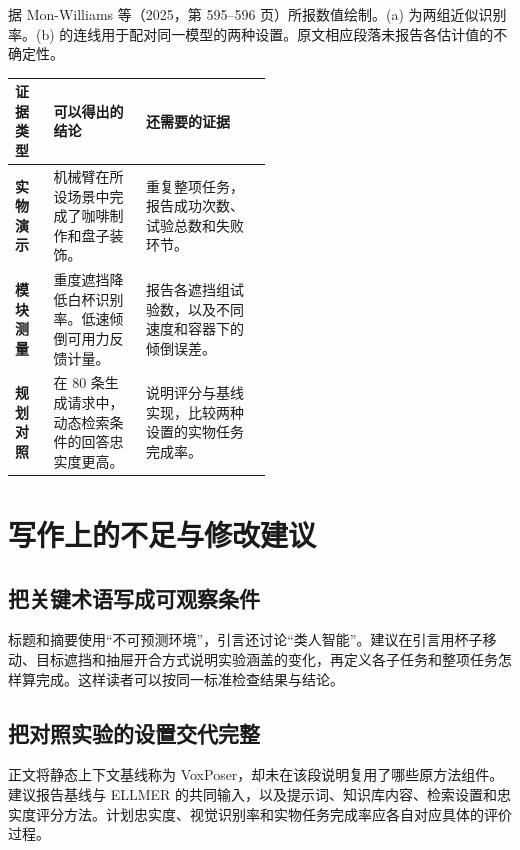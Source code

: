 \documentclass[UTF8,11pt,a4paper,twoside,fontset=none,heading=false]{ctexart}
\begin{document}
\begin{center}
\begin{minipage}{\linewidth}
\label{fig:results}
{\small\raggedright 据 Mon-Williams 等（2025，第 595--596 页）所报数值绘制。(a) 为两组近似识别率。(b) 的连线用于配对同一模型的两种设置。原文相应段落未报告各估计值的不确定性。\par}
\end{minipage}
\end{center}

\begin{center}
\begin{minipage}{\linewidth}
\centering
{}
\label{tab:evidence}
\small
\renewcommand{\arraystretch}{1.15}
\begin{tabularx}{\linewidth}{
  @{}>{\raggedright\arraybackslash\bfseries}p{0.15\linewidth}
  >{\raggedright\arraybackslash}p{0.36\linewidth}
  >{\raggedright\arraybackslash}X@{}}
\toprule
证据类型 & \textbf{可以得出的结论} & \textbf{还需要的证据} \\
\midrule
实物演示 & 机械臂在所设场景中完成了咖啡制作和盘子装饰。
  & 重复整项任务，报告成功次数、试验总数和失败环节。 \\
\addlinespace[3pt]
模块测量 & 重度遮挡降低白杯识别率。低速倾倒可用力反馈计量。
  & 报告各遮挡组试验数，以及不同速度和容器下的倾倒误差。 \\
\addlinespace[3pt]
规划对照 & 在 80 条生成请求中，动态检索条件的回答忠实度更高。
  & 说明评分与基线实现，比较两种设置的实物任务完成率。 \\
\bottomrule
\end{tabularx}
\end{minipage}
\end{center}

\clearpage
\section{写作上的不足与修改建议}

\subsection*{把关键术语写成可观察条件}
标题和摘要使用“不可预测环境”，引言还讨论“类人智能”。建议在引言用杯子移动、目标遮挡和抽屉开合方式说明实验涵盖的变化，再定义各子任务和整项任务怎样算完成。这样读者可以按同一标准检查结果与结论。

\subsection*{把对照实验的设置交代完整}
正文将静态上下文基线称为 VoxPoser，却未在该段说明复用了哪些原方法组件。建议报告基线与 ELLMER 的共同输入，以及提示词、知识库内容、检索设置和忠实度评分方法。计划忠实度、视觉识别率和实物任务完成率应各自对应具体的评价过程。
\end{document}
